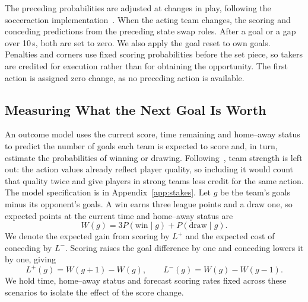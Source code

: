 \documentclass[runningheads]{llncs}
\newcommand{\Lp}{L^{+}}
\newcommand{\Lm}{L^{-}}
\begin{document}
The preceding probabilities are adjusted at changes in play, following the socceraction implementation~\cite{socceraction}. When the acting team changes, the scoring and conceding predictions from the preceding state swap roles. After a goal or a gap over 10\,s, both are set to zero. We also apply the goal reset to own goals. Penalties and corners use fixed scoring probabilities before the set piece, so takers are credited for execution rather than for obtaining the opportunity. The first action is assigned zero change, as no preceding action is available.

\subsection{Measuring What the Next Goal Is Worth}
An outcome model uses the current score, time remaining and home--away status to predict the number of goals each team is expected to score and, in turn, estimate the probabilities of winning or drawing. Following~\cite{kharrat2020}, team strength is left out: the action values already reflect player quality, so including it would count that quality twice and give players in strong teams less credit for the same action. The model specification is in Appendix~\ref{app:stakes}. Let $g$ be the team's goals minus its opponent's goals. A win earns three league points and a draw one, so expected points at the current time and home--away status are
\begin{equation}
W(g)=3P(\mathrm{win}\mid g)+P(\mathrm{draw}\mid g).
\end{equation}
We denote the expected gain from scoring by $\Lp$ and the expected cost of conceding by $\Lm$. Scoring raises the goal difference by one and conceding lowers it by one, giving
\begin{equation}
\Lp(g)=W(g{+}1)-W(g),\qquad
\Lm(g)=W(g)-W(g{-}1).
\end{equation}
We hold time, home--away status and forecast scoring rates fixed across these scenarios to isolate the effect of the score change.
\end{document}
